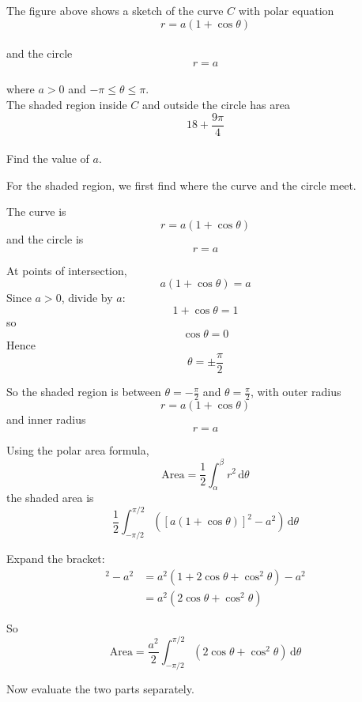 \documentclass[leqno]{article}
\begin{document}
\begin{enumerate}[
	  label=\textbf{\arabic*.},
	  leftmargin=*,
	  topsep=0pt,
	  partopsep=0pt,
	  parsep=0pt
	]
\begin{figure}[H]
	\end{figure}
	
	
	The figure above shows a sketch of the curve $C$ with polar equation
	\[
	r=a(1+\cos\theta)
	\] \\
	and the circle
	\[
	r=a
	\] \\
	where $a>0$ and $-\pi\leq\theta\leq\pi$. \\
	
	The shaded region inside $C$ and outside the circle has area
	\[
	18+\frac{9\pi}{4}
	\] \\
	Find the value of $a$.  \\
	
	\vspace*{30pt}
	
	\begin{tcolorbox}[colback=white, colframe=scarlet, title={\textbf{Solution}}, breakable, grow to left by=6mm, grow to right by=10mm]
	For the shaded region, we first find where the curve and the circle meet.
	
	The curve is
	\[
	r=a(1+\cos\theta)
	\]
	and the circle is
	\[
	r=a
	\]
	
	At points of intersection,
	\[
	a(1+\cos\theta)=a
	\]
	Since $a>0$, divide by $a$:
	\[
	1+\cos\theta=1
	\]
	so
	\[
	\cos\theta=0
	\]
	Hence
	\[
	\theta=\pm \frac{\pi}{2}
	\]
	
	So the shaded region is between $\theta=-\frac{\pi}{2}$ and $\theta=\frac{\pi}{2}$, with outer radius
	\[
	r=a(1+\cos\theta)
	\]
	and inner radius
	\[
	r=a
	\]
	
	Using the polar area formula,
	\[
	\text{Area}=\frac12\int_{\alpha}^{\beta} r^2\,\mathrm{d}\theta
	\]
	the shaded area is
	\[
	\frac12\int_{-\pi/2}^{\pi/2}\left([a(1+\cos\theta)]^2-a^2\right)\,\mathrm{d}\theta
	\]
	
	Expand the bracket:
	\begin{align*}
	[a(1+\cos\theta)]^2-a^2
	&=a^2(1+2\cos\theta+\cos^2\theta)-a^2 \\
	&=a^2(2\cos\theta+\cos^2\theta)
	\end{align*}
	
	So
	\[
	\text{Area}=\frac{a^2}{2}\int_{-\pi/2}^{\pi/2}\left(2\cos\theta+\cos^2\theta\right)\,\mathrm{d}\theta
	\]
	
	Now evaluate the two parts separately.
	

\end{tcolorbox}
\end{enumerate}
\end{document}
